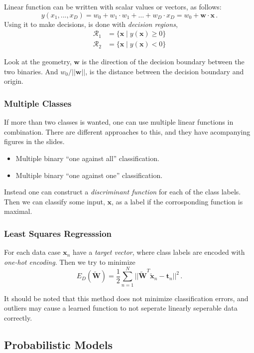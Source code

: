 Linear function can be written with scalar values or vectors, as follows:
\[
    y(x_1, ..., x_D) = w_0 + w_1 \cdot w_1 + \dots + w_D \cdot x_D = w_0 + \mathbf{w} \cdot \mathbf{x}\,.
\]
Using it to make decisions, is done with \emph{decision regions},
\begin{align*}
    \mathcal{R}_1 &= \{\mathbf{x} \mid y(\mathbf{x}) \geq 0\} \\
    \mathcal{R}_2 &= \{\mathbf{x} \mid y(\mathbf{x}) < 0 \}
\end{align*}

Look at the geometry, $\mathbf{w}$ is the direction of the decision boundary between the two binaries.
And $w_0 / || \mathbf{w} ||$, is the distance between the decision boundary and origin.

\subsubsection{Multiple Classes}

If more than two classes is wanted, one can use multiple linear functions in combination.
There are different approaches to this, and they have acompanying figures in the slides.
\begin{itemize}
    \item Multiple binary ``one against all'' classification.
    \item Multiple binary ``one against one'' classification.
\end{itemize}

Instead one can construct a \emph{discriminant function} for each of the class labels.
Then we can classify some input, $\mathbf{x}$, as a label if the corrosponding function is maximal.

\subsubsection{Least Squares Regresssion}

For each data case $\mathbf{x}_n$ have a \emph{target vector}, where class labels are encoded with \emph{one-hot encoding}.
Then we try to minimize
\[
    E_D(\mathbf{\tilde{W}}) = \frac 1 2 \sum_{n=1}^N || \mathbf{\tilde{W}}^T \mathbf{\tilde{x}}_n - \mathbf{t}_n ||^2\,.
\]

It should be noted that this method does not minimize classification errors, and outliers may cause a learned function to not seperate linearly seperable data correctly.

\subsection{Probabilistic Models}

